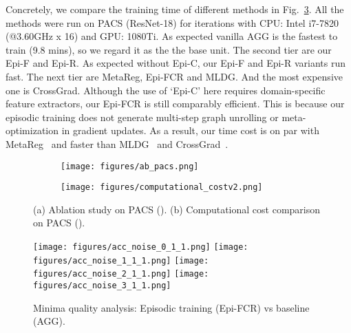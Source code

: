 \documentclass[10pt,twocolumn,letterpaper]{article}
\begin{document}
Concretely, we compare the training time of different methods in Fig.~\ref{fig:comp-cost}. All the methods were run on PACS (ResNet-18) for  iterations with CPU: Intel i7-7820 (@3.60GHz x 16) and GPU: 1080Ti. As expected vanilla AGG is the fastest to train (9.8 mins), so we regard it as the the base unit. The second tier are our Epi-F and Epi-R. As expected without Epi-C, our Epi-F and Epi-R variants run fast. The next tier are MetaReg, Epi-FCR and MLDG. And the most expensive one is CrossGrad. Although the use of `Epi-C' here requires domain-specific feature extractors, our Epi-FCR is still comparably efficient. This is because our episodic training does not generate multi-step graph unrolling or meta-optimization in gradient updates. As a result, our time cost is on par with MetaReg~\cite{NIPS2018_metareg} and faster than MLDG~\cite{Li2018MLDG} and CrossGrad~\cite{shankar2018generalizing}. 







\begin{figure}[t]
    \centering
    \begin{subfigure}[b]{0.4185\linewidth}
    \texttt{[image: figures/ab\_pacs.png]}
    \vspace{-0.77cm}
    \caption{}
    \label{fig:ab-pacs}
    \end{subfigure}
    \begin{subfigure}[b]{0.5715\linewidth}
    \texttt{[image: figures/computational\_costv2.png]}
    \vspace{-0.63cm}
    \caption{}
    \label{fig:comp-cost}
    \end{subfigure}
    \vspace{-0.7cm}
    \caption{\small (a) Ablation study on PACS (). (b) Computational cost comparison on PACS ().}
\vspace{-0.3cm}
\end{figure}






\begin{figure*}[tb]
    \centering
    \texttt{[image: figures/acc\_noise\_0\_1\_1.png]}
    \texttt{[image: figures/acc\_noise\_1\_1\_1.png]}
    \texttt{[image: figures/acc\_noise\_2\_1\_1.png]}
    \texttt{[image: figures/acc\_noise\_3\_1\_1.png]}
    \vspace{-0.3cm}
    \caption{\small Minima quality analysis: Episodic training (Epi-FCR) vs baseline (AGG). 
    }
\label{fig:acc-vs-noise}
\end{figure*}
\end{document}

